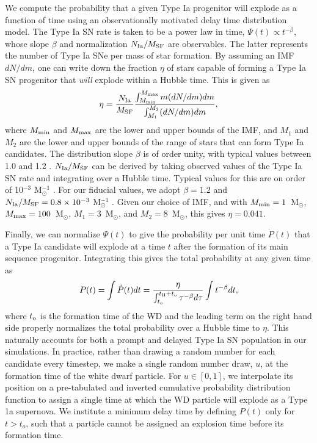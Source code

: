 We compute the probability that a given Type Ia progenitor will explode as a function of time using an observationally motivated delay time distribution model. The Type Ia SN rate is taken to be a power law in time, $\Psi (t) \propto t^{-\beta}$, whose slope $\beta$ and normalization $N_{\rm Ia}/M_{\rm SF}$ are observables. The latter represents the number of Type Ia SNe per mass of star formation.  By assuming an IMF  $dN/dm$, one can write down the fraction $\eta$ of stars capable of forming a Type Ia SN progenitor that \textit{will} explode within a Hubble time. This is given as
\begin{equation}
\eta = \frac{N_{\rm Ia}}{M_{\rm SF}} \frac{\int_{M_{\rm min}}^{M_{\rm max}} m (dN/dm) dm }{\int_{M_{1}}^{M_{2}} (dN/dm) dm},
\end{equation}
where $M_{\rm min}$ and $M_{\rm max}$ are the lower and upper bounds of the IMF, and $M_{1}$ and $M_{2}$ are the lower and upper bounds of the range of stars that can form Type Ia candidates. The distribution slope $\beta$ is of order unity, with typical values between 1.0 and 1.2 \citep[see][for a recent review]{Maoz2014}. $N_{\rm Ia}/M_{\rm SF}$ can be derived by taking observed values of the Type Ia SN rate and integrating over a Hubble time. Typical values for this are on order of 10$^{-3}$ M$_{\odot}^{-1}$ \citep{Maoz2014}. For our fiducial values, we adopt $\beta = 1.2$ \citep{Maoz2010} and $N_{\rm Ia}/M_{\rm SF} = 0.8\times 10^{-3}$ M$_{\odot}^{-1}$ \citep{GraurMaoz2013}. Given our choice of IMF, and with $M_{\rm min} = 1$~M$_{\odot}$, $M_{\rm max}=100$~M$_{\odot}$, $M_{1}=3$~M$_{\odot}$, and $M_{2}=8$~M$_{\odot}$, this gives $\eta = 0.041$.

Finally, we can normalize $\Psi(t)$ to give the probability per unit time $\dot{P}(t)$ that a Type Ia candidate will explode at a time $t$ after the formation of its main sequence progenitor. Integrating this gives the total probability at any given time as
\begin{equation}
P(t) = \int \dot{P}(t)dt = \frac{\eta}{{ \int_{t_{\rm o}}^{t_{\rm H} + t_{\rm o}} \tau^{-\beta} d\tau}} \int t^{-\beta} dt,
\end{equation}
where $t_{\rm o}$ is the formation time of the WD and the leading term on the right hand side properly normalizes the total probability over a Hubble time to $\eta$. This naturally accounts for both a prompt and delayed Type Ia SN population in our simulations.
In practice, rather than drawing a random number for each candidate every timestep, we make a single random number draw, $u$, at the formation time of the white dwarf particle. For $u \in [0,1]$, we interpolate its position on a pre-tabulated and inverted cumulative probability distribution function to assign a single time at which the WD particle will explode as a Type 1a supernova. We institute a minimum delay time by defining $P(t)$ only for $t > t_o$, such that a particle cannot be assigned an explosion time before its formation time.

